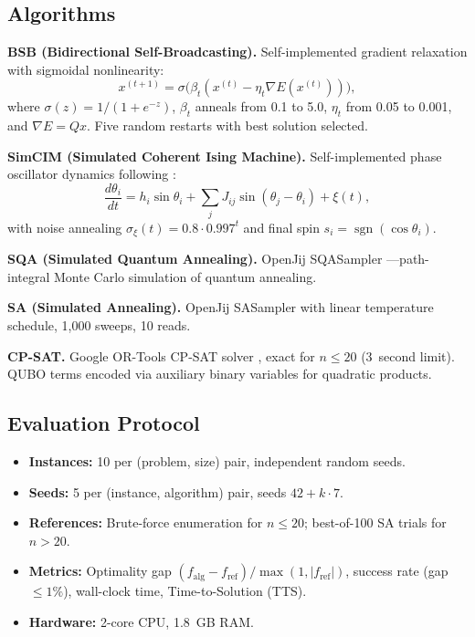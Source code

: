 \documentclass[10pt,twocolumn]{article}
\begin{document}
\subsection{Algorithms}

\textbf{BSB (Bidirectional Self-Broadcasting).} Self-implemented gradient relaxation with sigmoidal nonlinearity:
\begin{equation}
x^{(t+1)} = \sigma\bigl(\beta_t (x^{(t)} - \eta_t \nabla E(x^{(t)}))\bigr),
\end{equation}
where $\sigma(z)=1/(1+e^{-z})$, $\beta_t$ anneals from 0.1 to 5.0, $\eta_t$ from 0.05 to 0.001, and $\nabla E=Qx$. Five random restarts with best solution selected.

\textbf{SimCIM (Simulated Coherent Ising Machine).} Self-implemented phase oscillator dynamics following \cite{leleu2021}:
\begin{equation}
\frac{d\theta_i}{dt} = h_i\sin\theta_i + \sum_j J_{ij}\sin(\theta_j-\theta_i) + \xi(t),
\end{equation}
with noise annealing $\sigma_\xi(t)=0.8\cdot0.997^t$ and final spin $s_i=\operatorname{sgn}(\cos\theta_i)$.

\textbf{SQA (Simulated Quantum Annealing).} OpenJij SQASampler \cite{openjij}---path-integral Monte Carlo simulation of quantum annealing.

\textbf{SA (Simulated Annealing).} OpenJij SASampler with linear temperature schedule, 1,000 sweeps, 10 reads.

\textbf{CP-SAT.} Google OR-Tools CP-SAT solver \cite{ortools}, exact for $n\leq20$ (3~second limit). QUBO terms encoded via auxiliary binary variables for quadratic products.

\subsection{Evaluation Protocol}
\label{sec:protocol}
\begin{itemize}
\item \textbf{Instances:} 10 per (problem, size) pair, independent random seeds.
\item \textbf{Seeds:} 5 per (instance, algorithm) pair, seeds $42+k\cdot7$.
\item \textbf{References:} Brute-force enumeration for $n\leq20$; best-of-100 SA trials for $n>20$.
\item \textbf{Metrics:} Optimality gap $(f_{\text{alg}}-f_{\text{ref}})/\max(1,|f_{\text{ref}}|)$, success rate (gap $\leq1\%$), wall-clock time, Time-to-Solution (TTS).
\item \textbf{Hardware:} 2-core CPU, 1.8~GB RAM.
\end{itemize}
\end{document}
